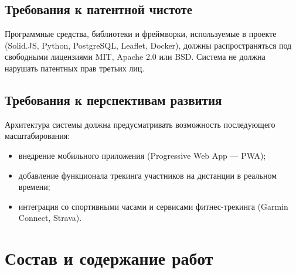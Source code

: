 \documentclass[a4paper,12pt]{article}
\begin{document}
\subsection{Требования к патентной чистоте}
Программные средства, библиотеки и фреймворки, используемые в проекте (Solid.JS, Python, PostgreSQL, Leaflet, Docker), должны распространяться под свободными лицензиями MIT, Apache 2.0 или BSD. Система не должна нарушать патентных прав третьих лиц.

\subsection{Требования к перспективам развития}
Архитектура системы должна предусматривать возможность последующего масштабирования:
\begin{itemize}
	\item внедрение мобильного приложения (Progressive Web App — PWA);
	\item добавление функционала трекинга участников на дистанции в реальном времени;
	\item интеграция со спортивными часами и сервисами фитнес-трекинга (Garmin Connect, Strava).
\end{itemize}

\section{Состав и содержание работ}
\end{document}
